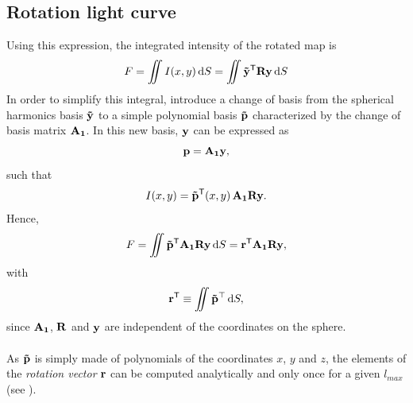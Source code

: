 \documentclass[modern]{aastex631}
\begin{document}
\subsection{Rotation light curve}
Using this expression, the integrated intensity of the rotated map is
\begin{equation}F = \iint I(x,y)\,\text{d}S = \iint \bvec{\tilde y^\mathsf{T}}\bvec{R}\bvec{y}\,\text{d}S\end{equation}
In order to simplify this integral, \citealt{starry} introduce a change of basis from the spherical harmonics basis ${\mathbf{\tilde y}}$ to a simple polynomial basis ${\mathbf{\tilde p}}$ characterized by the change of basis matrix ${\mathbf{A_1}}$. In this new basis, ${\mathbf{y}}$ can be expressed as
\begin{equation}\bvec{p} = \bvec{A_1}\bvec{y},\end{equation}
such that 
\begin{equation}I(x, y) = \bvec{\tilde p^\mathsf{T}}(x, y)\,\bvec{A_1}\bvec{R}\bvec{y}.\end{equation}
Hence,
\begin{equation}F = \iint \bvec{\tilde p^\mathsf{T}}\bvec{A_1}\bvec{R}\bvec{y}\,\text{d}S = \bvec{r^\mathsf{T}}\bvec{A_1}\bvec{R}\bvec{y},\end{equation}
with
\begin{equation}\bvec{r^\mathsf{T}} \equiv \iint \mathbf{\tilde{p}}^\top\,\text{d}S,\end{equation}
since ${\mathbf{A_1}}$, ${\mathbf{R}}$ and ${\mathbf{y}}$ are independent of the coordinates on the sphere.\\\\
As ${\mathbf{\tilde{p}}}$ is simply made of polynomials of the coordinates $x$, $y$ and $z$, the elements of the \textit{rotation vector} ${\mathbf{r}}$ can be computed analytically and only once for a given $l_{max}$ (see \citealt[Eq. 20]{starry}).\\\\
\end{document}
